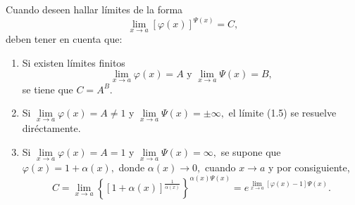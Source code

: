 \begin{property}
	Cuando deseen hallar l\'imites de la forma 
	\begin{equation}
	\lim\limits_{x\to a}\left[\varphi(x)\right]^{\varPsi(x)}=C,
	\end{equation}
	deben tener en cuenta que:
	\begin{enumerate}
		\item Si existen l\'imites finitos 
		\[
		\lim\limits_{x\to a}\varphi(x)=A\text{ y }\lim\limits_{x\to a}\varPsi(x)=B,
		\]
		se tiene que \(C=A^B.\)\newline
		
		\item Si \(\lim\limits_{x\to a}\varphi(x)=A\neq 1\) y \(\lim\limits_{x\to a}\varPsi(x)=\pm\infty,\) el l\'imite (1.5) se resuelve dir\'ectamente.\newline
		
		\item Si \(\lim\limits_{x\to a}\varphi(x)=A=1\) y \(\lim\limits_{x\to a}\varPsi(x)=\infty,\) se supone que \(\varphi(x)=1+\alpha(x),\) donde \(\alpha(x)\to 0,\)  cuando \(x\to a\) y por consiguiente,
		\[
		C=\lim\limits_{x\to a}\left\{\left[1+\alpha(x)\right]^{\frac{1}{\alpha(x)}}\right\}^{\alpha(x)\varPsi(x)}=e^{\lim\limits_{x\to a}\left[\varphi(x)-1\right]\varPsi(x)}.
		\]
	\end{enumerate}
\end{property}

